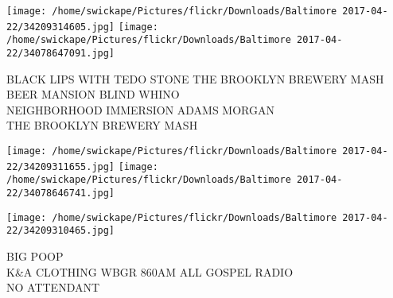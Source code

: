 \documentclass[10pt,letterpaper]{article}
\begin{document}
\texttt{[image: /home/swickape/Pictures/flickr/Downloads/Baltimore 2017-04-22/34209314605.jpg]}
\texttt{[image: /home/swickape/Pictures/flickr/Downloads/Baltimore 2017-04-22/34078647091.jpg]}

BLACK LIPS WITH TEDO STONE THE BROOKLYN BREWERY MASH\\
BEER MANSION BLIND WHINO\\
NEIGHBORHOOD IMMERSION ADAMS MORGAN\\
THE BROOKLYN BREWERY MASH
\pagebreak

\texttt{[image: /home/swickape/Pictures/flickr/Downloads/Baltimore 2017-04-22/34209311655.jpg]}
\texttt{[image: /home/swickape/Pictures/flickr/Downloads/Baltimore 2017-04-22/34078646741.jpg]}

\texttt{[image: /home/swickape/Pictures/flickr/Downloads/Baltimore 2017-04-22/34209310465.jpg]}

BIG POOP\\
K\&A CLOTHING WBGR 860AM ALL GOSPEL RADIO\\
NO ATTENDANT
\pagebreak
\end{document}
